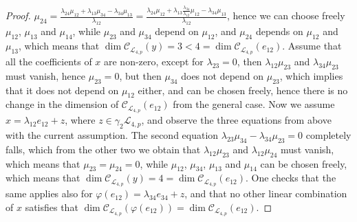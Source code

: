 \documentclass[12pt]{article}
\begin{document}
\begin{proof}
$\mu_{24}=\frac{\lambda_{24}\mu_{12}+\lambda_{13}\mu_{34}-\lambda_{34}\mu_{13}}{\lambda_{12}}=\frac{\lambda_{24}\mu_{12}+\lambda_{13}\frac{\lambda_{34}}{\lambda_{12}}\mu_{12}-\lambda_{34}\mu_{13}}{\lambda_{12}}$, hence we can choose freely $\mu_{12}$, $\mu_{13}$ and $\mu_{14}$, while $\mu_{23}$ and $\mu_{34}$ depend on $\mu_{12}$, and $\mu_{24}$ depends on $\mu_{12}$ and $\mu_{13}$, which means that $\dim\mathcal{C}_{\mathcal{L}_{4,p}}(y)=3<4=\dim\mathcal{C}_{\mathcal{L}_{4,p}}(e_{12})$. Assume that all the coefficients of $x$ are non-zero, except for $\lambda_{23}=0$, then $\lambda_{12}\mu_{23}$ and $\lambda_{34}\mu_{23}$ must vanish, hence $\mu_{23}=0$, but then $\mu_{34}$ does not depend on $\mu_{23}$, which implies that it does not depend on $\mu_{12}$ either, and can be chosen freely, hence there is no change in the dimension of $\mathcal{C}_{\mathcal{L}_{4,p}}(e_{12})$ from the general case. Now we assume $x=\lambda_{12}e_{12}+z$, where $z\in\gamma_2\mathcal{L}_{4,p}$, and observe the three equations from above with the current assumption. The second equation $\lambda_{23}\mu_{34}-\lambda_{34}\mu_{23}=0$ completely falls, which from the other two we obtain that $\lambda_{12}\mu_{23}$ and $\lambda_{12}\mu_{24}$ must vanish, which means that $\mu_{23}=\mu_{24}=0$, while $\mu_{12}$, $\mu_{34}$, $\mu_{13}$ and $\mu_{14}$ can be chosen freely, which means that $\dim\mathcal{C}_{\mathcal{L}_{4,p}}(y)=4=\dim\mathcal{C}_{\mathcal{L}_{4,p}}(e_{12})$. One checks that the same applies also for $\varphi(e_{12})=\lambda_{34}e_{34}+z$, and that no other linear combination of $x$ satisfies that $\dim\mathcal{C}_{\mathcal{L}_{4,p}}(\varphi(e_{12}))=\dim\mathcal{C}_{\mathcal{L}_{4,p}}(e_{12})$.
\end{proof}
\end{document}
